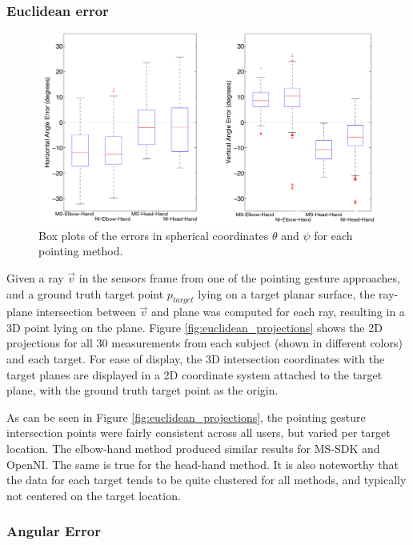 \subsubsection{Euclidean error}
\label{sec:pointing_euclidean_error}

\begin{figure}[ht!]%
\centering
\includegraphics[width=1.0\textwidth]{pics/boxplots_largerfont}
\caption{Box plots of the errors in spherical coordinates $\theta$ and $\psi$ for each pointing method.}
\label{fig:pointing_angular_boxplots}
\end{figure}

Given a ray $\vec{v}$ in the sensors frame from one of the pointing gesture approaches, and a ground truth target point $p_{target}$ lying on a target planar surface, the ray-plane intersection between $\vec{v}$ and plane was computed for each ray, resulting in a 3D point lying on the plane. Figure \ref{fig:euclidean_projections} shows the 2D projections for all 30 measurements from each subject (shown in different colors) and each target. For ease of display, the 3D intersection coordinates with the target planes are displayed in a 2D coordinate system attached to the target plane, with the ground truth target point as the origin.  

As can be seen in Figure \ref{fig:euclidean_projections},  the pointing gesture intersection points were fairly consistent across all users, but varied per target location.  The elbow-hand method produced similar results for MS-SDK and OpenNI. The same is true for the head-hand method.  It is also noteworthy that the data for each target tends to be quite clustered for all methods, and typically not centered on the target location.

\subsubsection{Angular Error}
\label{sec:pointing_angular_error}

